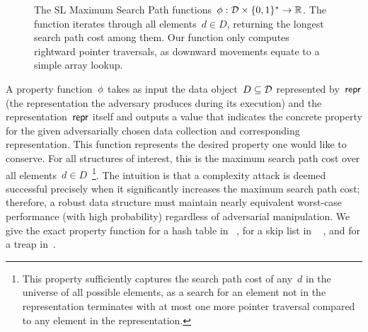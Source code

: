 \begin{figure}[h]
            \centering
            \begin{pchstack}[boxed,center,space=0.5em]
            \end{pchstack}
      \caption[SL Maxium Search Path.]{The SL Maximum Search Path functions~$\phi : \mathcal{D} \times \{0,1 \}^{*} \rightarrow  \mathbb{R}$. The function iterates through all elements~$d \in D$, returning the longest search path cost among them. Our function only computes rightward pointer traversals, as downward movements equate to a simple array lookup. 
      } 
      \label{fig:sl-cost}
\end{figure}


A property function~$\phi$ takes as input the data object~$D \subseteq \mathcal{D}$  represented by~$\mathsf{repr}$ (the representation the adversary produces during its execution) and the representation~$\mathsf{repr}$ itself and outputs a value that indicates the concrete property for the given adversarially chosen data collection and corresponding representation. This function represents the desired property one would like to conserve. For all structures of interest, this is the maximum search path cost over all elements~$d \in D$~\footnote{This property sufficiently captures the search path cost of any~$d$ in the universe of all possible elements, as a search for an element not in the representation terminates with at most one more pointer traversal compared to any element in the representation.}. The intuition is that a complexity attack is deemed successful precisely when it significantly increases the maximum search path cost; therefore, a robust data structure must maintain nearly equivalent worst-case performance (with high probability) regardless of adversarial manipulation. We give the exact property function for a hash table in ~,  for a skip list in ~ , and for a treap in~.

